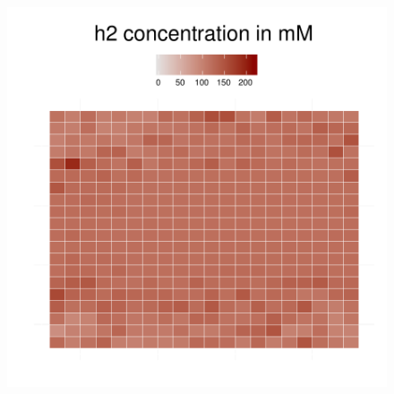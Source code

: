\begin{figure}[h!]
{\begin{minipage}[t]{0.3\textwidth}
  \end{minipage}
  \begin{minipage}[t]{0.3\textwidth}
    \includegraphics[width=\textwidth]{../results/img/beijerinckii_20x20_seed943_h250.pdf}
  \end{minipage}
  }
\end{figure}
